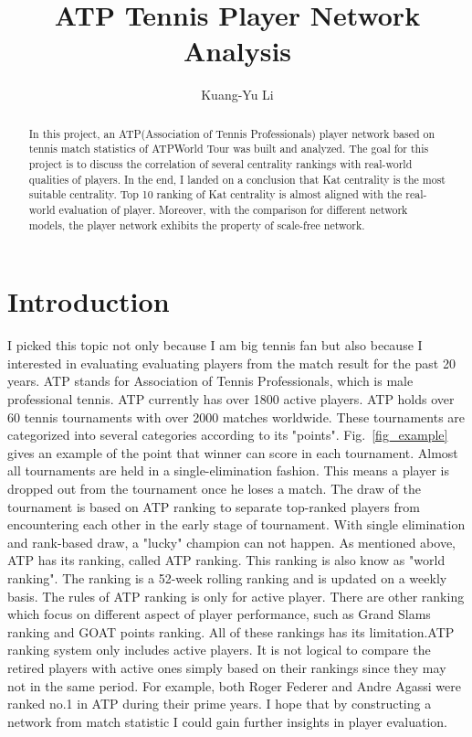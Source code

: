 \documentclass[runningheads]{llncs}
\begin{document}
%
\title{ATP Tennis Player Network Analysis}

\author{Kuang-Yu Li}

%
\maketitle              %
%
\begin{abstract}
In this project, an ATP(Association of Tennis Professionals) player network 
based on tennis match statistics of ATPWorld Tour was built and analyzed.
The goal for this project is to discuss the correlation of several centrality rankings with 
real-world qualities of players. In the end, I landed on a conclusion that Kat centrality is the most
suitable centrality. Top 10 ranking of Kat centrality is almost aligned with the real-world evaluation of 
player. Moreover, with the comparison for different network models, the player network exhibits the 
property of scale-free network. 

\end{abstract}
%
%
%
\section{Introduction}
I picked this topic not only because I am big tennis fan but also because I interested in evaluating evaluating players from the match result for the past 20 years. 
ATP stands for Association of Tennis Professionals, which is male professional tennis. ATP currently has over 1800 active players. ATP holds over 60 tennis tournaments with over 2000 matches worldwide. These tournaments are categorized into several categories according to its "points". 
Fig.~\ref{fig_example} gives an example of the point that winner can score in each tournament. Almost all tournaments are held in a single-elimination fashion. This means a player is dropped out from the tournament once he loses a match. The draw of the tournament is based on ATP ranking to separate top-ranked players from encountering each other in the early stage of tournament. With single elimination and rank-based draw, a "lucky" champion can not happen.
As mentioned above, ATP has its ranking, called ATP ranking. This ranking is also know as "world ranking". The ranking is a 52-week rolling ranking and is updated on a weekly basis. The rules of ATP ranking is only for active player. There are other ranking which focus on different aspect of player performance, such as Grand Slams ranking and GOAT points ranking. All of these rankings has its limitation.ATP ranking system only includes  active players. It is not logical to compare the retired players with active ones simply based on their rankings since they may not in the same period. For example, both Roger Federer and Andre Agassi were ranked no.1 in ATP during their prime years. I hope that by constructing a network from match statistic I could gain further insights in player evaluation. 
\end{document}
